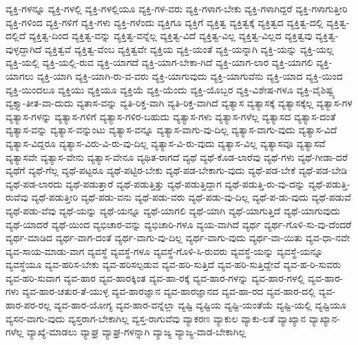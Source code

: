 {ವ್ಯಕ್ತಿ-ಗಳನ್ನೂ
ವ್ಯಕ್ತಿ-ಗಳಲ್ಲಿ
ವ್ಯಕ್ತಿ-ಗಳಲ್ಲಿಯೂ
ವ್ಯಕ್ತಿ-ಗಳ-ವರು
ವ್ಯಕ್ತಿ-ಗಳಾಗ-ಬೇಕು
ವ್ಯಕ್ತಿ-ಗಳಾಗಿದ್ದರೆ
ವ್ಯಕ್ತಿ-ಗಳಾಗುತ್ತೀರಿ
ವ್ಯಕ್ತಿ-ಗಳಿಂದ
ವ್ಯಕ್ತಿ-ಗಳಿಗೆ
ವ್ಯಕ್ತಿ-ಗಳು
ವ್ಯಕ್ತಿ-ಗಳೆಂದು
ವ್ಯಕ್ತಿಗೂ
ವ್ಯಕ್ತಿಗೆ
ವ್ಯಕ್ತಿತ್ವ
ವ್ಯಕ್ತಿತ್ವಕ್ಕೆ
ವ್ಯಕ್ತಿತ್ವದ
ವ್ಯಕ್ತಿತ್ವ-ದಲ್ಲಿ
ವ್ಯಕ್ತಿತ್ವ-ದಲ್ಲಿದೆ
ವ್ಯಕ್ತಿತ್ವ-ದಿಂದ
ವ್ಯಕ್ತಿತ್ವ-ವನ್ನು
ವ್ಯಕ್ತಿತ್ವ-ವನ್ನೆಲ್ಲ
ವ್ಯಕ್ತಿತ್ವ-ವಿದೆ
ವ್ಯಕ್ತಿತ್ವ-ವಿಲ್ಲ
ವ್ಯಕ್ತಿತ್ವ-ವಿಲ್ಲದ
ವ್ಯಕ್ತಿತ್ವವು
ವ್ಯಕ್ತಿತ್ವ-ವುಳ್ಳದ್ದಾಗಿದೆ
ವ್ಯಕ್ತಿತ್ವವೆ
ವ್ಯಕ್ತಿತ್ವ-ವೆಂಬ
ವ್ಯಕ್ತಿತ್ವವೇ
ವ್ಯಕ್ತಿಯ
ವ್ಯಕ್ತಿ-ಯಂತೆ
ವ್ಯಕ್ತಿ-ಯನ್ನಾಗಿ
ವ್ಯಕ್ತಿ-ಯನ್ನು
ವ್ಯಕ್ತಿ-ಯಲ್ಲ
ವ್ಯಕ್ತಿ-ಯಲ್ಲಿ
ವ್ಯಕ್ತಿ-ಯಲ್ಲಿ-ರುವ
ವ್ಯಕ್ತಿ-ಯಾಗದೆ
ವ್ಯಕ್ತಿ-ಯಾಗ-ಬೇಕಾ-ಗಿದೆ
ವ್ಯಕ್ತಿ-ಯಾಗ-ಲಾರ
ವ್ಯಕ್ತಿ-ಯಾಗಲಿ
ವ್ಯಕ್ತಿ-ಯಾಗಲು
ವ್ಯಕ್ತಿ-ಯಾಗಿ
ವ್ಯಕ್ತಿ-ಯಾಗಿ-ರು-ವ-ವರು
ವ್ಯಕ್ತಿ-ಯಾಗುವುದು
ವ್ಯಕ್ತಿ-ಯಾಗುವೆನು
ವ್ಯಕ್ತಿ-ಯಾದ
ವ್ಯಕ್ತಿ-ಯಿಂದ
ವ್ಯಕ್ತಿ-ಯಿಂದಲೂ
ವ್ಯಕ್ತಿಯು
ವ್ಯಕ್ತಿಯೂ
ವ್ಯಕ್ತಿಯೆ
ವ್ಯಕ್ತಿ-ಯೆಂದು
ವ್ಯಕ್ತಿ-ಯೊಬ್ಬರ
ವ್ಯಕ್ತಿ-ವಿಶೇಷ-ಗಳೂ
ವ್ಯಕ್ತಿ-ವೈಶಿಷ್ಟ್ಯ
ವ್ಯಕ್ತ್ಯಾ-ತೀತ-ವಾ-ದುದು
ವ್ಯತಾಸ-ವನ್ನು
ವ್ಯತಿ-ರಿಕ್ತ-ವಾಗಿ
ವ್ಯತಿ-ರಿಕ್ತ-ವಾಗಿದೆ
ವ್ಯತ್ಯಾಸ
ವ್ಯತ್ಯಾಸಕ್ಕೆ
ವ್ಯತ್ಯಾಸಕ್ಕೆಲ್ಲ
ವ್ಯತ್ಯಾಸ-ಗಳ
ವ್ಯತ್ಯಾಸ-ಗಳನ್ನು
ವ್ಯತ್ಯಾಸ-ಗಳಿಗೆ
ವ್ಯತ್ಯಾಸ-ಗಳಿರ-ಬಹುದು
ವ್ಯತ್ಯಾಸ-ಗಳು
ವ್ಯತ್ಯಾಸ-ಗಳೆಲ್ಲ
ವ್ಯತ್ಯಾಸದ
ವ್ಯತ್ಯಾಸ-ದಂತೆ
ವ್ಯತ್ಯಾಸ-ವನ್ನು
ವ್ಯತ್ಯಾಸ-ವನ್ನುಂಟು
ವ್ಯತ್ಯಾಸ-ವನ್ನೂ
ವ್ಯತ್ಯಾಸ-ವಾಗು-ವು-ದಿಲ್ಲ
ವ್ಯತ್ಯಾಸ-ವಾಗು-ವುದು
ವ್ಯತ್ಯಾಸ-ವಿದೆ
ವ್ಯತ್ಯಾಸ-ವಿದ್ದರೂ
ವ್ಯತ್ಯಾಸ-ವಿರು-ವಿ-ರು-ವು-ದಿಲ್ಲ
ವ್ಯತ್ಯಾಸ-ವಿ-ರು-ವುದು
ವ್ಯತ್ಯಾಸ-ವಿಲ್ಲ
ವ್ಯತ್ಯಾಸವೂ
ವ್ಯತ್ಯಾಸವೆ
ವ್ಯತ್ಯಾಸವೇ
ವ್ಯತ್ಯಾಸ-ವೇನು
ವ್ಯತ್ಯಾಸ-ವೇನೂ
ವ್ಯಥಿತ-ರಾಗದೆ
ವ್ಯಥೆ
ವ್ಯಥೆ-ಕೊಡ-ಲಾರೆವು
ವ್ಯಥೆ-ಗಳು
ವ್ಯಥೆ-ಗೀಡಾ-ದರೆ
ವ್ಯಥೆಗೆ
ವ್ಯಥೆ-ಗೆಲ್ಲ
ವ್ಯಥೆ-ಪಟ್ಟರೂ
ವ್ಯಥೆ-ಪಟ್ಟಿರ-ಬೇಕು
ವ್ಯಥೆ-ಪಡ-ಬೇಕಾಗು-ವುದು
ವ್ಯಥೆ-ಪಡ-ಬೇಕೆ
ವ್ಯಥೆ-ಪಡ-ಬೇಡಿ
ವ್ಯಥೆ-ಪಡ-ಲಾರದು
ವ್ಯಥೆ-ಪಡುತ್ತಾರೆ
ವ್ಯಥೆ-ಪಡುತ್ತಿತ್ತು
ವ್ಯಥೆ-ಪಡುತ್ತಿದ್ದಾಗ
ವ್ಯಥೆ-ಪಡುತ್ತಿ-ರು-ವು-ದನ್ನು
ವ್ಯಥೆ-ಪಡುತ್ತಿ-ರುವೆವು
ವ್ಯಥೆ-ಪಡುತ್ತೀರಿ
ವ್ಯಥೆ-ಪಡು-ವನು
ವ್ಯಥೆ-ಪಡು-ವರು
ವ್ಯಥೆ-ಪಡು-ವು-ದಿಲ್ಲ
ವ್ಯಥೆ-ಪ-ಡು-ವುದು
ವ್ಯಥೆ-ಪಡುವೆ
ವ್ಯಥೆ-ಪಡು-ವೆವು
ವ್ಯಥೆ-ಯನ್ನು
ವ್ಯಥೆ-ಯನ್ನೂ
ವ್ಯಥೆ-ಯಾಗಲಿ
ವ್ಯಥೆ-ಯಾಗಿ
ವ್ಯಥೆ-ಯಾಗುತ್ತಿದೆ
ವ್ಯಥೆ-ಯಾಗುವುದು
ವ್ಯಥೆ-ಯಾದರೆ
ವ್ಯಥೆ-ಯಿಂದ
ವ್ಯಭಿಚಾರ-ವನ್ನು
ವ್ಯಭಿಚಾರಿ-ಗಳೂ
ವ್ಯಯ-ವಾಗಿದೆ
ವ್ಯರ್ಥ
ವ್ಯರ್ಥ-ಗೊಳಿ-ಸು-ವು-ದೆಂದರೆ
ವ್ಯರ್ಥ-ಮಾಡಿದ
ವ್ಯರ್ಥ-ವಾಗ-ದಂತೆ
ವ್ಯರ್ಥ-ವಾಗು-ವು-ದಿಲ್ಲ
ವ್ಯರ್ಥ-ವಾಗು-ವುದು
ವ್ಯರ್ಥ-ವಾ-ಯಿತು
ವ್ಯವ-ಧಾ-ನವೇ
ವ್ಯವ-ಸಾಯ-ಮಾಡು-ವಾಗ
ವ್ಯವಸ್ಥೆ
ವ್ಯವಸ್ಥೆ-ಗಳೂ
ವ್ಯವಸ್ಥೆ-ಗೊಳಿ-ಸಿ-ರುವರು
ವ್ಯವಸ್ಥೆ-ಯನ್ನು
ವ್ಯವಸ್ಥೆ-ಯನ್ನೂ
ವ್ಯವಸ್ಥೆಯೂ
ವ್ಯವ-ಹರಿಸ-ಬೇಕು
ವ್ಯವ-ಹರಿಸಲ್ಪಡುವ
ವ್ಯವ-ಹರಿ-ಸುತ್ತಿದೆ
ವ್ಯವ-ಹರಿ-ಸುತ್ತಿದ್ದೇವೆ
ವ್ಯವ-ಹ-ರಿ-ಸುವರು
ವ್ಯವ-ಹರಿ-ಸುವಾಗ
ವ್ಯವ-ಹಾರ
ವ್ಯವ-ಹಾರಕ್ಕಿಂತ
ವ್ಯವ-ಹಾ-ರಕ್ಕೆ
ವ್ಯವ-ಹಾರ-ಗಳನ್ನು
ವ್ಯವ-ಹಾರ-ಗಳಲ್ಲಿ
ವ್ಯವ-ಹಾರ-ಗಳು
ವ್ಯವ-ಹಾರ-ಚತುರ-ತೆ-ಯುಳ್ಳ
ವ್ಯವ-ಹಾರಜ್ಞಾನ
ವ್ಯವ-ಹಾರಜ್ಞಾನದ
ವ್ಯವ-ಹಾ-ರದ
ವ್ಯವ-ಹಾರ-ದಲ್ಲಿ
ವ್ಯವ-ಹಾರ-ಪರ-ರಲ್ಲ
ವ್ಯವ-ಹಾರ-ಯೋಗ್ಯ
ವ್ಯವ-ಹಾರ-ವನ್ನೆಲ್ಲಾ
ವ್ಯಷ್ಟಿ
ವ್ಯಷ್ಟಿಯ
ವ್ಯಷ್ಟಿ-ಯಂತೆಯೆ
ವ್ಯಷ್ಟಿ-ಯಲ್ಲಿ
ವ್ಯಷ್ಟಿಯೂ
ವ್ಯಸನ-ವಾಗು-ವುದು
ವ್ಯಸ್ತರಾಗ-ಬೇಕಾಗಿಲ್ಲ
ವ್ಯಸ್ತ-ರಾಗುವೆವು
ವ್ಯಾಕರಣ
ವ್ಯಾಕುಲ
ವ್ಯಾಕು-ಲತೆ
ವ್ಯಾಖ್ಯಾನ
ವ್ಯಾಖ್ಯಾನ-ಗಳೆಲ್ಲ
ವ್ಯಾಖ್ಯೆ-ಮಾಡಲು
ವ್ಯಾಘ್ರ
ವ್ಯಾಘ್ರ-ಗಳನ್ನಾಗಿ
ವ್ಯಾಜ್ಯ
ವ್ಯಾಜ್ಯ-ವಾಡ-ಬೇಕಾಗಿಲ್ಲ
}
